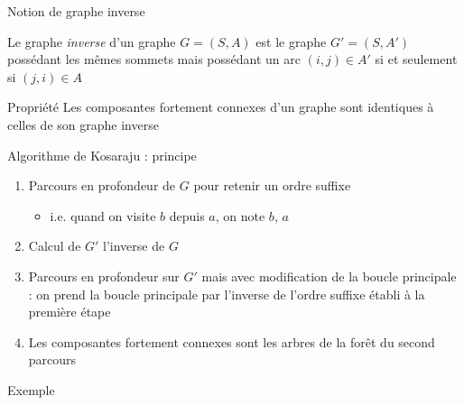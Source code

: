 \begin{frame}{Notion de graphe inverse}
\begin{definition}
    Le graphe \emph{inverse} d'un graphe $G=(S,A)$ est le graphe $G'=(S,A')$ possédant les mêmes sommets mais possédant un arc $(i,j) \in A'$ si et seulement si $(j,i) \in A$    
\end{definition}

\begin{example}
\end{example}

\begin{block}{Propriété}
    Les composantes fortement connexes d'un graphe sont identiques à celles de son graphe inverse
\end{block}

\end{frame}

\begin{frame}{Algorithme de Kosaraju : principe}

\begin{enumerate}
    \item Parcours en profondeur de $G$ pour retenir un ordre suffixe
    \begin{itemize}
        \item i.e. quand on visite $b$ depuis $a$, on note $b$, $a$
    \end{itemize}
    \item Calcul de $G'$ l'inverse de $G$
    \item Parcours en profondeur sur $G'$ mais avec modification de la boucle principale : on prend la boucle principale par l'inverse de l'ordre suffixe établi à la première étape
    \item Les composantes fortement connexes sont les arbres de la forêt du second parcours
\end{enumerate}

\end{frame}

\begin{frame}{Exemple}
    
\end{frame}